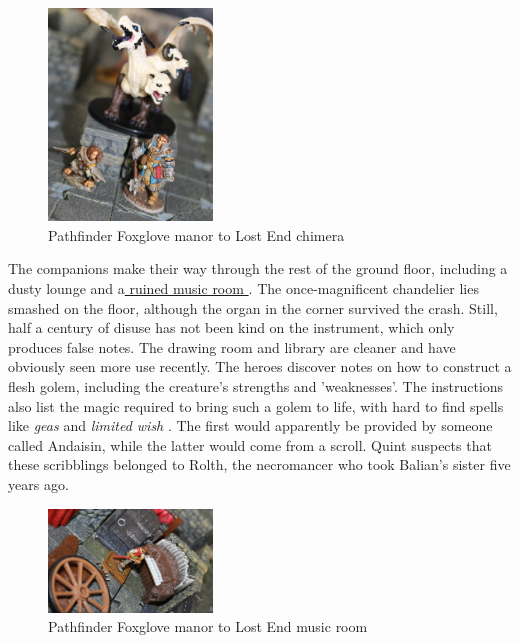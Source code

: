 \begin{figure}[h]
	\centering
	\includegraphics[width=0.39\textwidth]{images/Pathfinder-Foxglove-manor-to-Lost-End-chimera-513923128.jpg}
	\caption{Pathfinder Foxglove manor to Lost End chimera}
	\label{fig:Pathfinder-Foxglove-manor-to-Lost-End-chimera-513923128}
\end{figure}

The companions make their way through the rest of the ground floor, including a dusty lounge and a\hyperref[fig:Pathfinder-Foxglove-manor-to-Lost-End-music-room-513922417]{ ruined music room } . The once-magnificent chandelier lies smashed on the floor, although the organ in the corner survived the crash. Still, half a century of disuse has not been kind on the instrument, which only produces false notes. The drawing room and library are cleaner and have obviously seen more use recently. The heroes discover notes on how to construct a flesh golem, including the creature's strengths and 'weaknesses'. The instructions also list the magic required to bring such a golem to life, with hard to find spells like  {\itshape geas} and  {\itshape limited wish} . The first would apparently be provided by someone called Andaisin, while the latter would come from a scroll. Quint suspects that these scribblings belonged to Rolth, the necromancer who took Balian's sister five years ago. \\

\begin{figure}[h]
	\centering
	\includegraphics[width=0.39\textwidth]{images/Pathfinder-Foxglove-manor-to-Lost-End-music-room-513922417.jpg}
	\caption{Pathfinder Foxglove manor to Lost End music room}
	\label{fig:Pathfinder-Foxglove-manor-to-Lost-End-music-room-513922417}
\end{figure}

